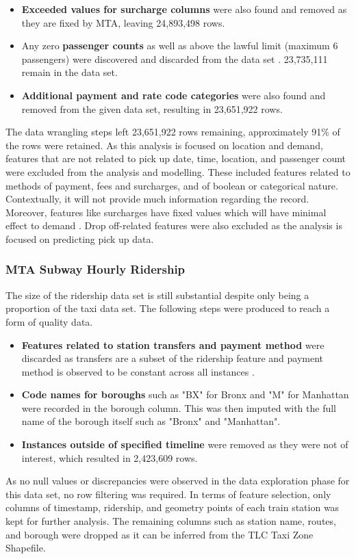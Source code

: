 \documentclass[11pt]{article}
\begin{document}
\begin{itemize}
    \item \textbf{Exceeded values for surcharge columns} were also found and removed as they are fixed by MTA\cite{YellowTaxiDataDict}, leaving 24,893,498 rows.
    
    \item Any zero \textbf{passenger counts} as well as above the lawful limit (maximum 6 passengers) were discovered and discarded from the data set \cite{TLCFAQ}. 23,735,111 remain in the data set.

    \item \textbf{Additional payment and rate code categories} were also found and removed from the given data set, resulting in 23,651,922 rows.
    
\end{itemize}
The data wrangling steps left 23,651,922 rows remaining, approximately 91\% of the rows were retained. As this analysis is focused on location and demand, features that are not related to pick up date, time, location, and passenger count were excluded from the analysis and modelling. These included features related to methods of payment, fees and surcharges, and of boolean or categorical nature. Contextually, it will not provide much information regarding the record. Moreover, features like surcharges have fixed values which will have minimal effect to demand \cite{YellowTaxiDataDict} \cite{TLCUserGuide}. Drop off-related features were also excluded as the analysis is focused on predicting pick up data.

\subsubsection{MTA Subway Hourly Ridership}
The size of the ridership data set is still substantial despite only being a proportion of the taxi data set. The following steps were produced to reach a form of quality data.
\begin{itemize}
    \item \textbf{Features related to station transfers and payment method} were discarded as transfers are a subset of the ridership feature \cite{SubwayDataDict} and payment method is observed to be constant across all instances \cite{SubwayDataDict}. 
    \item \textbf{Code names for boroughs} such as "BX" for Bronx and "M" for Manhattan were recorded in the borough column. This was then imputed with the full name of the borough itself such as "Bronx" and "Manhattan". 
    \item \textbf{Instances outside of specified timeline} were removed as they were not of interest, which resulted in 2,423,609 rows.
\end{itemize}
As no null values or discrepancies were observed in the data exploration phase for this data set, no row filtering was required. In terms of feature selection, only columns of timestamp, ridership, and geometry points of each train station was kept for further analysis. The remaining columns such as station name, routes, and borough were dropped as it can be inferred from the TLC Taxi Zone Shapefile.
\end{document}
